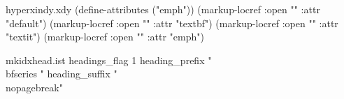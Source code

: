 
\providecommand\theindex{} %
\usepackage{imakeidx} %

\begin{filecontents*}{hyperxindy.xdy}
(define-attributes ("emph"))
(markup-locref :open "" :attr "default")
(markup-locref :open "\textbf{}" :attr "textbf")
(markup-locref :open "\textit{}" :attr "textit")
(markup-locref :open "\emph{}" :attr "emph")
\end{filecontents*}

\begin{filecontents*}{mkidxhead.ist}
headings_flag 1
heading_prefix "{\\bfseries "
heading_suffix "}\\nopagebreak\n"
\end{filecontents*}


\makeindex[
  noautomatic,
  intoc,
  options=-s mkidxhead.ist -l -c,
]


